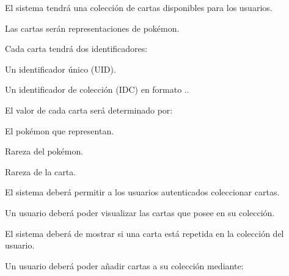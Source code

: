 


\begin{RFColeccionCartas}
	\item El sistema tendrá una colección de cartas disponibles para los usuarios.
	\begin{RFColeccionCartas}
		\item Las cartas serán representaciones de pokémon.
		\item Cada carta tendrá dos identificadores:
		\begin{RFColeccionCartas}
			\item Un identificador único (UID).
			\item Un identificador de colección (IDC) en formato ..
		\end{RFColeccionCartas}
		\item El valor de cada carta será determinado por:
		\begin{RFColeccionCartas}
			\item El pokémon que representan.
			\item Rareza del pokémon.
			\item Rareza de la carta.
		\end{RFColeccionCartas}
	\end{RFColeccionCartas}
	\item El sistema deberá permitir a los usuarios autenticados coleccionar cartas.\label{req_coleccion_cartas}
	\begin{RFColeccionCartas}
		\item Un usuario deberá poder visualizar las cartas que posee en su colección.
		\item El sistema deberá de mostrar si una carta está repetida en la colección del usuario.
		\item Un usuario deberá poder añadir cartas a su colección mediante:
		\begin{RFColeccionCartas}

\end{RFColeccionCartas}
\end{RFColeccionCartas}
\end{RFColeccionCartas}
